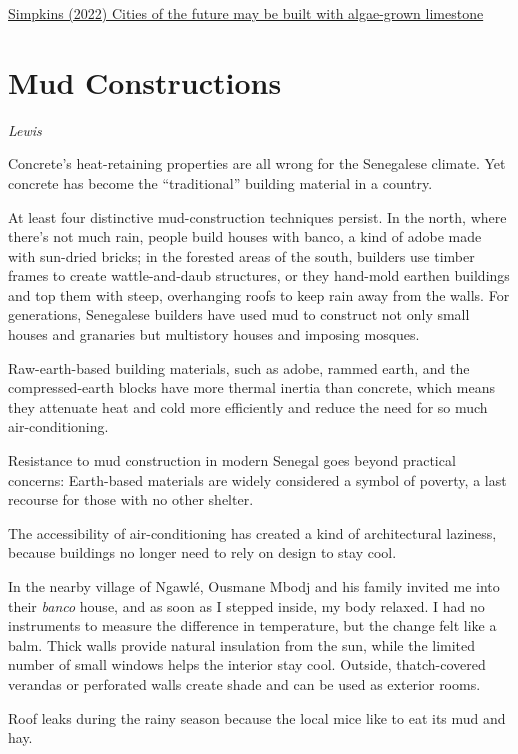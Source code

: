 \documentclass[
]{book}
\begin{document}
\href{https://www.colorado.edu/today/2022/06/23/cities-future-may-be-built-algae-grown-limestone}{Simpkins (2022) Cities of the future may be built with algae-grown limestone}

\hypertarget{mud-constructions}{%
\section{Mud Constructions}\label{mud-constructions}}

\emph{Lewis}

Concrete's heat-retaining properties are all wrong for the Senegalese climate.
Yet concrete has become the ``traditional'' building material in a country.

At least four distinctive mud-construction techniques persist. In the north, where there's not much rain, people build houses with banco, a kind of adobe made with sun-dried bricks; in the forested areas of the south, builders use timber frames to create wattle-and-daub structures, or they hand-mold earthen buildings and top them with steep, overhanging roofs to keep rain away from the walls. For generations, Senegalese builders have used mud to construct not only small houses and granaries but multistory houses and imposing mosques.

Raw-earth-based building materials, such as adobe, rammed earth, and the compressed-earth blocks have more thermal inertia than concrete, which means they attenuate heat and cold more efficiently and reduce the need for so much air-conditioning.

Resistance to mud construction in modern Senegal goes beyond practical concerns: Earth-based materials are widely considered a symbol of poverty, a last recourse for those with no other shelter.

The accessibility of air-conditioning has created a kind of architectural laziness, because buildings no longer need to rely on design to stay cool.

In the nearby village of Ngawlé, Ousmane Mbodj and his family invited me into their \emph{banco} house, and as soon as I stepped inside, my body relaxed. I had no instruments to measure the difference in temperature, but the change felt like a balm.
Thick walls provide natural insulation from the sun, while the limited number of small windows helps the interior stay cool. Outside, thatch-covered verandas or perforated walls create shade and can be used as exterior rooms.

Roof leaks during the rainy season because the local mice like to eat its mud and hay.
\end{document}
